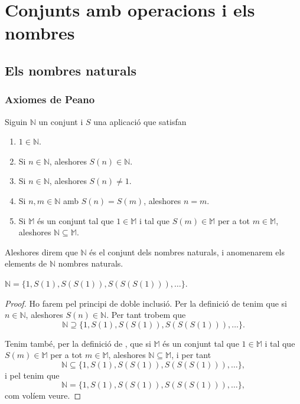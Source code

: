 \documentclass[../../Main.tex]{subfiles}
\begin{document}
\chapter{Conjunts amb operacions i els nombres}
\section{Els nombres naturals}
	\subsection{Axiomes de Peano}
	\begin{definition}
		\label{def:nombres naturals}
		Siguin \(\mathbb{N}\) un conjunt i \(S\) una aplicació que satisfan
		\begin{enumerate}
			\item \(1\in\mathbb{N}\).
			\item Si \(n\in\mathbb{N}\), aleshores \(S(n)\in\mathbb{N}\).
			\item Si \(n\in\mathbb{N}\), aleshores \(S(n)\neq1\).
			\item Si \(n,m\in\mathbb{N}\) amb \(S(n)=S(m)\), aleshores \(n=m\).
			\item Si \(\mathbb{M}\) és un conjunt tal que \(1\in\mathbb{M}\) i tal que \(S(m)\in\mathbb{M}\) per a tot \(m\in\mathbb{M}\), aleshores \(\mathbb{N}\subseteq\mathbb{M}\).
		\end{enumerate}
		Aleshores direm que \(\mathbb{N}\) és el conjunt dels nombres naturals, i anomenarem els elements de \(\mathbb{N}\) nombres naturals.
	\end{definition}
	\begin{lemma}
		\label{lema:primer element}
		\(\mathbb{N}=\{1,S(1),S(S(1)),S(S(S(1))),\dots\}\).
		\begin{proof}
			Ho farem pel principi de doble inclusió. Per la definició de  tenim que si \(n\in\mathbb{N}\), aleshores \(S(n)\in\mathbb{N}\). Per tant trobem que
			\[\mathbb{N}\supseteq\{1,S(1),S(S(1)),S(S(S(1))),\dots\}.\]
			
			Tenim també, per la definició de , que si \(\mathbb{M}\) és un conjunt tal que \(1\in\mathbb{M}\) i tal que \(S(m)\in\mathbb{M}\) per a tot \(m\in\mathbb{M}\), aleshores \(\mathbb{N}\subseteq\mathbb{M}\), i per tant
			\[\mathbb{N}\subseteq\{1,S(1),S(S(1)),S(S(S(1))),\dots\},\]
			i pel  tenim que
			\[\mathbb{N}=\{1,S(1),S(S(1)),S(S(S(1))),\dots\},\]
			com volíem veure.
		\end{proof}
	\end{lemma}
\end{document}
